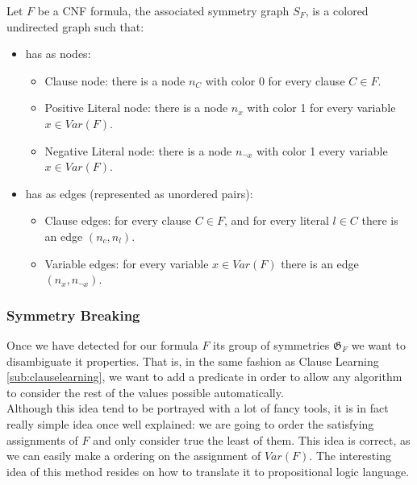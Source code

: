 {\begin{definition}
  Let $F$ be a CNF formula, the associated symmetry graph $S_F$, is a colored undirected graph such that:
  \begin{itemize}
  \item has as nodes:
    \begin{itemize}
    \item Clause node: there is a node $n_C$ with color 0 for every clause $C \in F$.
    \item Positive Literal node: there is a node $n_x$ with color 1 for every variable $x\in Var(F)$.
    \item Negative Literal node: there is a node $n_{\neg x}$ with color 1 every variable $x\in Var(F)$.
    \end{itemize}
  \item has as edges (represented as unordered pairs):
    \begin{itemize}
    \item Clause edges: for every clause $C\in F$, and for every literal $l\in C$ there is an edge $(n_c, n_l)$.
    \item Variable edges: for every variable $x\in Var(F)$ there is an edge $(n_x,n_{\neg x})$.
    \end{itemize}
  \end{itemize}
\end{definition}



\subsubsection{Symmetry Breaking}

Once we have detected for our formula $F$  its group of symmetries $\mathfrak{G}_F$ we want to disambiguate it properties. That is, in the same fashion as Clause Learning \ref{sub:clauselearning}, we want to add a predicate in order to allow any algorithm to consider the rest of the values possible automatically.\\

Although this idea tend to be portrayed with a lot of fancy tools, it is in fact really simple idea once well explained: we are going to order the satisfying assignments of $F$ and only consider true the least of them. This idea is correct, as we can easily make a ordering on the assignment of $Var(F)$. The interesting idea of this method resides on how to translate it to propositional logic language.\\

}
